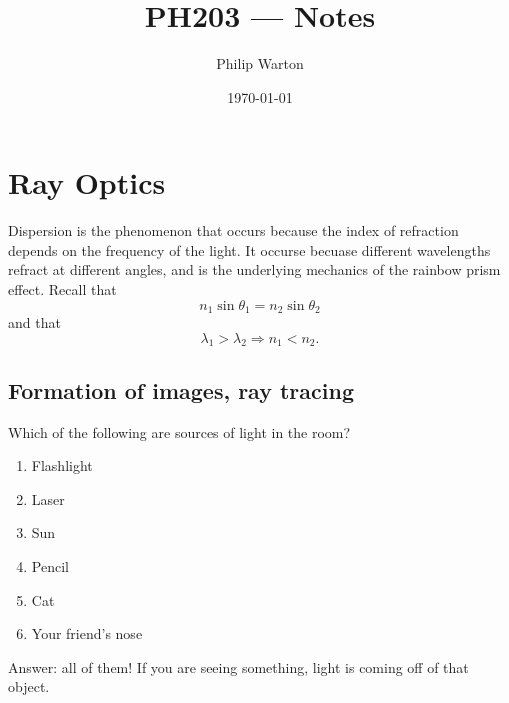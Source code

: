 \documentclass{article}
\theoremstyle{definition}
\begin{document}
\title{PH203 --- Notes}
\author{Philip Warton}
\date{\today}
\maketitle
\section{Ray Optics}
Dispersion is the phenomenon that occurs because the index of refraction depends on the frequency of the light.
It occurse becuase different wavelengths refract at different angles, and is the underlying mechanics of 
the rainbow prism effect.
Recall that 
\[
    n_1 \sin \theta_1 = n_2 \sin \theta_2   
\]
and that 
\[
    \lambda_1 > \lambda_2 \Rightarrow n_1 < n_2   
.\]
\subsection{Formation of images, ray tracing}
\begin{mdframed}[]
Which of the following are sources of light in the room?
\begin{enumerate}
    \item Flashlight
    \item Laser
    \item Sun 
    \item Pencil 
    \item Cat 
    \item Your friend's nose
\end{enumerate}
Answer: all of them! If you are seeing something, light is coming off of that object.
\end{mdframed}
\end{document}
